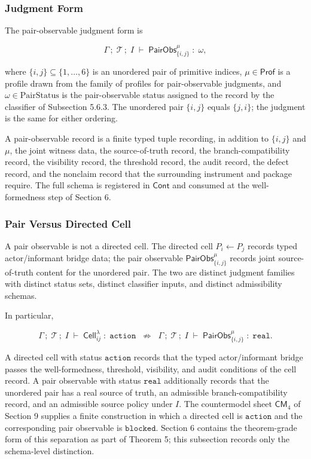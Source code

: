 \documentclass[11pt]{article}
\theoremstyle{definition}
\begin{document}
\subsubsection{Judgment Form}

The pair-observable judgment form is

\[
\Gamma\,;\;\mathcal T\,;\;I\;\vdash\;\mathsf{PairObs}_{\{i,j\}}^{\mu}\;:\;\omega,
\]

where \(\{i,j\}\subseteq\{1,\ldots,6\}\) is an unordered pair of primitive indices, \(\mu\in\mathsf{Prof}\) is a profile drawn from the family of profiles for pair-observable judgments, and \(\omega\in\mathrm{PairStatus}\) is the pair-observable status assigned to the record by the classifier of Subsection 5.6.3. The unordered pair \(\{i,j\}\) equals \(\{j,i\}\); the judgment is the same for either ordering.

A pair-observable record is a finite typed tuple recording, in addition to \(\{i,j\}\) and \(\mu\), the joint witness data, the source-of-truth record, the branch-compatibility record, the visibility record, the threshold record, the audit record, the defect record, and the nonclaim record that the surrounding instrument and package require. The full schema is registered in \(\mathsf{Cont}\) and consumed at the well-formedness step of Section 6.

\subsubsection{Pair Versus Directed Cell}

A pair observable is not a directed cell. The directed cell \(P_i\leftarrow P_j\) records typed actor/informant bridge data; the pair observable \(\mathsf{PairObs}_{\{i,j\}}^{\mu}\) records joint source-of-truth content for the unordered pair. The two are distinct judgment families with distinct status sets, distinct classifier inputs, and distinct admissibility schemas.

In particular,

\[
\Gamma\,;\;\mathcal T\,;\;I\;\vdash\;\mathsf{Cell}_{ij}^{\lambda}\;:\;\texttt{action}\;\;\not\Rightarrow\;\;\Gamma\,;\;\mathcal T\,;\;I\;\vdash\;\mathsf{PairObs}_{\{i,j\}}^{\mu}\;:\;\texttt{real}.
\]

A directed cell with status \(\texttt{action}\) records that the typed actor/informant bridge passes the well-formedness, threshold, visibility, and audit conditions of the cell record. A pair observable with status \(\texttt{real}\) additionally records that the unordered pair has a real source of truth, an admissible branch-compatibility record, and an admissible source policy under \(I\). The countermodel sheet \(\mathsf{CM}_4\) of Section 9 supplies a finite construction in which a directed cell is \(\texttt{action}\) and the corresponding pair observable is \(\texttt{blocked}\). Section 6 contains the theorem-grade form of this separation as part of Theorem 5; this subsection records only the schema-level distinction.
\end{document}
